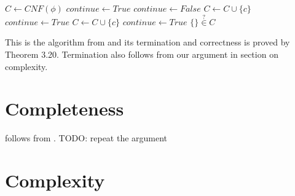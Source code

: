 \documentclass[english, shortabstract]{iithesis}
\theoremstyle{definition} \newtheorem{definition}{Definition}[chapter]
\theoremstyle{remark} \newtheorem{remark}[definition]{Observation}
\theoremstyle{plain} \newtheorem{theorem}[definition]{Theorem}
\theoremstyle{plain} \newtheorem{lemma}[definition]{Lemma}
\begin{document}
\begin{algorithm}
\begin{algorithmic}
\State $C \gets CNF(\phi)$
\State $continue \gets True$
\State $continue \gets False$
    \State $C \gets C \cup \{c\}$
    \State $continue \gets True$
\EndIf
{}
    \State $C \gets C \cup \{c\}$
    \State $continue \gets True$
\EndIf
\EndFor
\EndWhile
\State
\Return $\{\} \stackrel{?}{\in} C$
\EndProcedure
\end{algorithmic}
\end{algorithm}

This is the algorithm from \cite{resolution GF} and its termination and correctness is proved by Theorem 3.20.
Termination also follows from our argument in section on complexity.



    

\chapter{Completeness}

follows from \cite{resolution gf}. TODO: repeat the argument

\chapter{Complexity}
\end{document}
